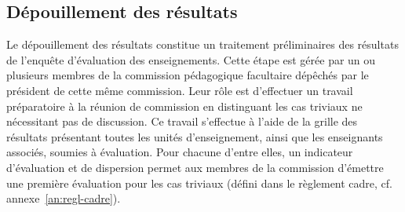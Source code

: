 \documentclass[a4paper,11pt]{report}
\begin{document}
\subsection{Dépouillement des résultats}\label{sec:depouillement-res}
Le dépouillement des résultats constitue un traitement préliminaires des résultats de l'enquête d'évaluation des enseignements.
Cette étape est gérée par un ou plusieurs membres de la commission pédagogique facultaire dépêchés par le président de cette même commission.
Leur rôle est d'effectuer un travail préparatoire à la réunion de commission en distinguant les cas triviaux ne nécessitant pas de discussion.
Ce travail s'effectue à l'aide de la grille des résultats présentant toutes les unités d'enseignement, ainsi que les enseignants associés, soumies à évaluation.
Pour chacune d'entre elles, un indicateur d'évaluation et de dispersion permet aux membres de la commission d'émettre une première évaluation pour les cas triviaux (défini dans le règlement cadre, cf. annexe~\ref{an:regl-cadre}).







\end{document}
